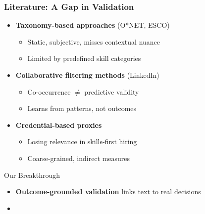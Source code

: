 \documentclass[11pt,xcolor={dvipsnames},hyperref={pdftex,pdfpagemode=UseNone,hidelinks,pdfdisplaydoctitle=true},usepdftitle=false]{beamer}
\begin{document}
\begin{frame}
\frametitle{Literature: A Gap in Validation}
\begin{itemize}
\item \textbf{Taxonomy-based approaches} (O*NET, ESCO)
  \begin{itemize}
  \item Static, subjective, misses contextual nuance
  \item Limited by predefined skill categories
  \end{itemize}

\item \textbf{Collaborative filtering methods} (LinkedIn)
  \begin{itemize}
  \item Co-occurrence $\neq$ predictive validity
  \item Learns from patterns, not outcomes
  \end{itemize}

\item \textbf{Credential-based proxies}
  \begin{itemize}
  \item Losing relevance in skills-first hiring
  \item Coarse-grained, indirect measures
  \end{itemize}
\end{itemize}

\begin{block}{Our Breakthrough}
\begin{itemize}
\item \textbf{Outcome-grounded validation} links text to real decisions
\item {}
\end{itemize}
\end{block}
\end{frame}
\end{document}
